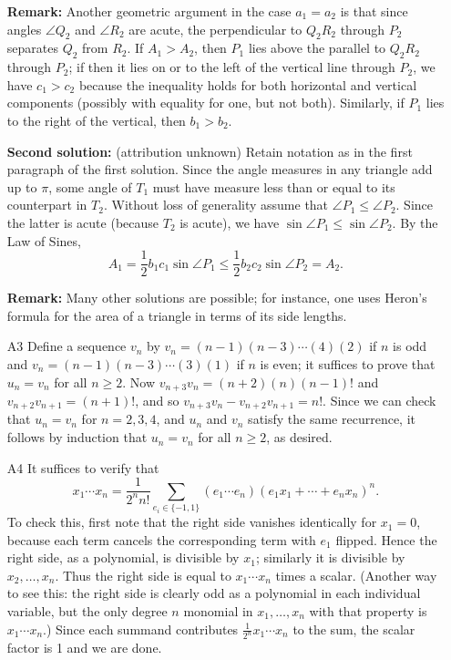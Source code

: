 \documentclass[amssymb,twocolumn,pra,10pt,aps]{revtex4-1}
\begin{document}
\begin{itemize}
\textbf{Remark:}
Another geometric argument in the case $a_1 = a_2$
is that since angles $\angle Q_2$ and $\angle R_2$
are acute, the perpendicular to $Q_2R_2$ through $P_2$ separates $Q_2$ from
$R_2$. If $A_1 > A_2$, then $P_1$ lies above the parallel to $Q_2R_2$
through $P_2$; if then it lies on or to the left of the vertical line
through $P_2$, we have $c_1 > c_2$ because the inequality holds
for both horizontal and vertical components (possibly with equality for one,
but not both). Similarly, if $P_1$ lies to the right of the vertical,
then $b_1 > b_2$.

\textbf{Second solution:} (attribution unknown)
Retain notation as in the first paragraph of the first solution.
Since the angle measures in any triangle add up to $\pi$, some angle
of $T_1$ must have measure less than or equal to its counterpart in
$T_2$. Without loss of generality assume that $\angle P_1 \leq \angle
P_2$. Since the latter is acute (because $T_2$ is acute), we have
$\sin \angle P_1 \leq \sin \angle P_2$. By the Law of Sines,
\[
A_1 = \frac{1}{2} b_1 c_1 \sin \angle P_1 \leq \frac{1}{2}
b_2 c_2 \sin \angle P_2 = A_2.
\]

\textbf{Remark:} Many other solutions are possible; for instance,
one uses Heron's formula for the area of a triangle in terms of
its side lengths.

\item[A3]
Define a sequence $v_n$ by $v_n = (n-1)(n-3)\cdots(4)(2)$ if $n$ is
odd and $v_n = (n-1)(n-3)\cdots(3)(1)$ if $n$ is even; it suffices to
prove that $u_n = v_n$ for all $n \geq 2$. Now $v_{n+3} v_n =
(n+2)(n)(n-1)!$ and $v_{n+2}v_{n+1} = (n+1)!$, and so $v_{n+3} v_n -
v_{n+2} v_{n+1} = n!$. Since we can check that $u_n = v_n$ for
$n=2,3,4$, and $u_n$ and $v_n$ satisfy the same recurrence, it
follows by induction that $u_n = v_n$ for all $n\geq 2$, as desired.

\item[A4]
It suffices to verify that
\[
x_1 \cdots x_n = \frac{1}{2^n n!} \sum_{e_i \in \{-1,1\}}
(e_1\cdots e_n) (e_1 x_1 + \cdots + e_n x_n)^n.
\]
To check this, first note that the right side vanishes identically
for $x_1 = 0$, because each term cancels the corresponding term with $e_1$
flipped. Hence the right side, as a polynomial, is divisible by $x_1$;
similarly it is divisible by $x_2, \dots, x_n$. Thus the right side
is equal to $x_1\cdots x_n$ times a scalar. (Another way to see this:
the right side is clearly odd as a polynomial in each individual variable,
but the only degree $n$ monomial in $x_1, \dots, x_n$ with that property
is $x_1 \cdots x_n$.) Since each summand
contributes $\frac{1}{2^n} x_1 \cdots x_n$ to the sum, the scalar factor is
1 and we are done.


\end{itemize}
\end{document}
